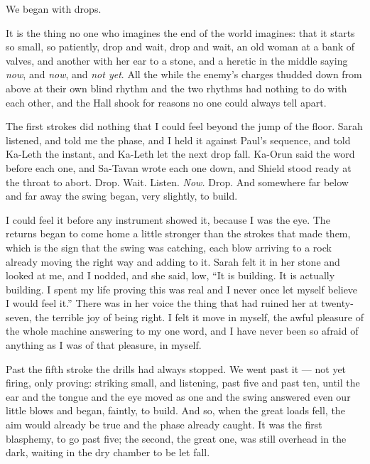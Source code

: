\ornament

We began with drops.\par

It is the thing no one who imagines the end of the world imagines: that it starts so small, so patiently, drop and wait, drop and wait, an old woman at a bank of valves, and another with her ear to a stone, and a heretic in the middle saying \emph{now}, and \emph{now}, and \emph{not yet}. All the while the enemy's charges thudded down from above at their own blind rhythm and the two rhythms had nothing to do with each other, and the Hall shook for reasons no one could always tell apart.\par

The first strokes did nothing that I could feel beyond the jump of the floor. Sarah listened, and told me the phase, and I held it against Paul's sequence, and told Ka-Leth the instant, and Ka-Leth let the next drop fall. Ka-Orun said the word before each one, and Sa-Tavan wrote each one down, and Shield stood ready at the throat to abort. Drop. Wait. Listen. \emph{Now.} Drop. And somewhere far below and far away the swing began, very slightly, to build.\par

I could feel it before any instrument showed it, because I was the eye. The returns began to come home a little stronger than the strokes that made them, which is the sign that the swing was catching, each blow arriving to a rock already moving the right way and adding to it. Sarah felt it in her stone and looked at me, and I nodded, and she said, low, ``It is building. It is actually building. I spent my life proving this was real and I never once let myself believe I would feel it.'' There was in her voice the thing that had ruined her at twenty-seven, the terrible joy of being right. I felt it move in myself, the awful pleasure of the whole machine answering to my one word, and I have never been so afraid of anything as I was of that pleasure, in myself.\par

\ornament

Past the fifth stroke the drills had always stopped. We went past it --- not yet firing, only proving: striking small, and listening, past five and past ten, until the ear and the tongue and the eye moved as one and the swing answered even our little blows and began, faintly, to build. And so, when the great loads fell, the aim would already be true and the phase already caught. It was the first blasphemy, to go past five; the second, the great one, was still overhead in the dark, waiting in the dry chamber to be let fall.\par

